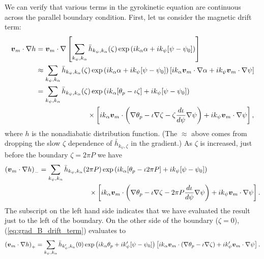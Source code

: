 \documentclass[11pt,letter]{article}
\newcommand{\vect}[1]{\mbox{\boldmath $#1$}}
\begin{document}
We can verify that various terms in the gyrokinetic equation are continuous
across the parallel boundary condition. First, let us consider the magnetic drift term:
\begin{align}
\vect{v}_{m}\cdot \nabla h 
&= \vect{v}_{m} \cdot \nabla \left[
\sum_{k_\psi,k_\alpha} \bar{h}_{k_\psi,k_\alpha}(\zeta) \exp \left( i k_\alpha \alpha + i k_\psi [\psi - \psi_0] \right) \right] \nonumber \\
&\approx 
\sum_{k_\psi,k_\alpha} \bar{h}_{k_\psi,k_\alpha}(\zeta)
\exp \left( i k_\alpha \alpha + i k_\psi [\psi - \psi_0] \right)
\left[ i k_\alpha \vect{v}_{m}\cdot \nabla \alpha + i k_\psi \vect{v}_{m}\cdot\nabla\psi \right] \nonumber \\
& =
\sum_{k_\psi,k_\alpha} \bar{h}_{k_\psi,k_\alpha}(\zeta)
\exp \left( i k_\alpha [\theta_p - \iota \zeta] + i k_\psi [\psi - \psi_0] \right) \nonumber \\
& \hspace{1in}\times \left[ i k_\alpha \vect{v}_{m}\cdot \left(\nabla \theta_p - \iota \nabla\zeta - \zeta \frac{d\iota}{d\psi} \nabla\psi \right) + i k_\psi \vect{v}_{m}\cdot\nabla\psi \right],
\label{eq:grad_B_drift_term}
\end{align}
where $h$ is the nonadiabatic distribution function. (The $\approx$ above comes from dropping the slow $\zeta$ dependence of $\bar{h}_{k_\psi,\zeta}$
in the gradient.) As $\zeta$ is increased, just before the boundary $\zeta = 2\pi P$ we have
\begin{align}
\left( \vect{v}_{m}\cdot \nabla h \right)_-
& =
\sum_{k_\psi,k_\alpha} \bar{h}_{k_\psi,k_\alpha}(2\pi P)
\exp \left( i k_\alpha [\theta_p - \iota 2\pi P] + i k_\psi [\psi - \psi_0] \right) \nonumber \\
& \hspace{1in}\times \left[ i k_\alpha \vect{v}_{m}\cdot \left(\nabla \theta_p - \iota \nabla\zeta - 2\pi P \frac{d\iota}{d\psi} \nabla\psi \right) + i k_\psi \vect{v}_{m}\cdot\nabla\psi \right].
\label{eq:v_B_term_minus}
\end{align}
The subscript on the left hand side indicates that we have evaluated the result just to the left of the boundary.
On the other side of the boundary ($\zeta = 0$), (\ref{eq:grad_B_drift_term}) evaluates to
\begin{equation}
\left(\vect{v}_{m}\cdot \nabla h \right)_+
= 
\sum_{k_\psi,k_\alpha} \bar{h}_{k'_\psi,k_\alpha}(0)
\exp \left( i k_\alpha \theta_p  + i k'_\psi [\psi - \psi_0] \right) 
\left[ i k_\alpha \vect{v}_{m}\cdot \left(\nabla \theta_p - \iota \nabla\zeta \right) + i k'_\psi \vect{v}_{m}\cdot\nabla\psi \right].
\end{equation}
\end{document}
